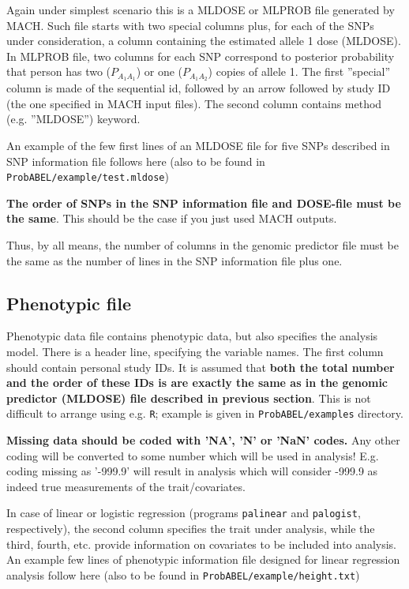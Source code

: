 \documentclass[12pt]{article}
\begin{document}
Again under simplest scenario this is a MLDOSE or MLPROB file generated by MACH.
Such file starts with two special columns plus, for each of the SNPs 
under consideration, a column containing the estimated allele 1 dose (MLDOSE).
In MLPROB file, two columns for each SNP correspond to posterior probability 
that person has two ($P_{A_1A_1}$) or one ($P_{A_1A_2}$) copies of allele 1. 
The first ''special'' column is made of the sequential id, 
followed by an arrow followed by study ID (the one specified in 
MACH input files). The second column contains method 
(e.g. ''MLDOSE'') keyword.

An example of the few first lines of an MLDOSE file for 
five SNPs described in SNP information file follows here (also 
to be found in \texttt{ProbABEL/example/test.mldose})



\textbf{The order of SNPs in the SNP information file and DOSE-file
must be the same}. This should be the case if you just used MACH outputs.

Thus, by all means, the number of columns in the genomic predictor file 
must be the same as the number of lines in the SNP information file plus one. 

\subsection{Phenotypic file}
\label{ssec:phenoin}

Phenotypic data file contains phenotypic data, but also specifies the 
analysis model. There is a header line, specifying the variable names. 
The first column should contain personal study IDs. It is assumed 
that \textbf{both the total number and the order of these IDs is are 
exactly the same as in the genomic predictor (MLDOSE) file described in 
previous section}. This is not difficult to arrange using e.g. \texttt{R}; 
example is given in \texttt{ProbABEL/examples} directory. 

\textbf{Missing data should be coded with 'NA', 'N' or 'NaN' codes.} Any 
other coding will be converted to some number which will be used in 
analysis! E.g. coding missing as '-999.9' will result in analysis which 
will consider -999.9 as indeed true measurements of the trait/covariates.  

In case of linear or logistic regression (programs \texttt{palinear} and 
\texttt{palogist}, respectively), the second column specifies the trait 
under analysis, while the third, fourth, etc. 
provide information on covariates to be included into analysis. 
An example few lines of phenotypic information file designed for 
linear regression analysis follow here (also 
to be found in \texttt{ProbABEL/example/height.txt})
\end{document}
